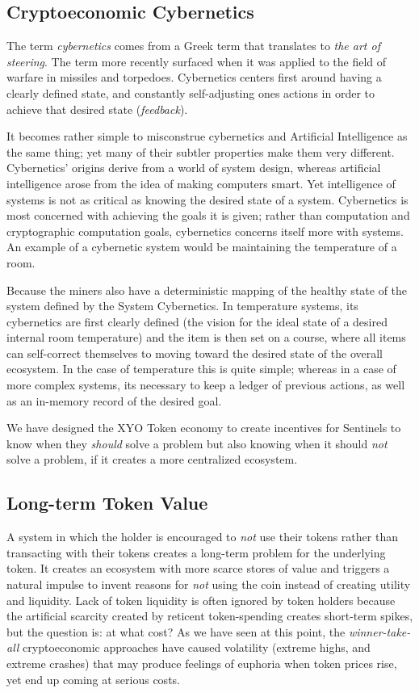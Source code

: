 \documentclass{article}
\begin{document}
\subsection{Cryptoeconomic Cybernetics}
The term \textit{cybernetics} comes from a Greek term that translates to \textit{the art of steering}. The term more recently surfaced when it was applied to the field of warfare in missiles and torpedoes. Cybernetics centers first around having a clearly defined {state}, and constantly self-adjusting ones actions in order to achieve that desired state (\textit{feedback}).

It becomes rather simple to misconstrue cybernetics and Artificial Intelligence as the same thing; yet many of their subtler properties make them very different. Cybernetics' origins derive from a world of system design, whereas artificial intelligence arose from the idea of making computers smart. Yet intelligence of systems is not as critical as knowing the desired state of a system. Cybernetics is most concerned with achieving the goals it is given; rather than computation and cryptographic computation goals, cybernetics concerns itself more with systems. An example of a cybernetic system would be maintaining the temperature of a room.

Because the miners also have a deterministic mapping of the healthy state of the system defined by the System Cybernetics. In temperature systems, its cybernetics are first clearly defined (the vision for the ideal state of a desired internal room temperature) and the item is then set on a course, where all items can self-correct themselves to moving toward the desired state of the overall ecosystem. In the case of temperature this is quite simple; whereas in a case of more complex systems, its necessary to keep a ledger of previous actions, as well as an in-memory record of the desired goal.

We have designed the XYO Token economy to create incentives for Sentinels to know when they \textit{should} solve a problem but also knowing when it should \textit{not} solve a problem, if it creates a more centralized ecosystem.

\subsection{Long-term Token Value}
A system in which the holder is encouraged to \textit{not} use their tokens rather than transacting with their tokens creates a long-term problem for the underlying token.  It creates an ecosystem with more scarce stores of value and triggers a natural impulse to invent reasons for \textit{not} using the coin instead of creating utility and liquidity. Lack of token liquidity is often ignored by token holders because the artificial scarcity created by reticent token-spending creates short-term spikes, but the question is: at what cost? As we have seen at this point, the \textit{winner-take-all} cryptoeconomic approaches have caused volatility (extreme highs, and extreme crashes) that may produce feelings of euphoria when token prices rise, yet end up coming at serious costs.
\end{document}
